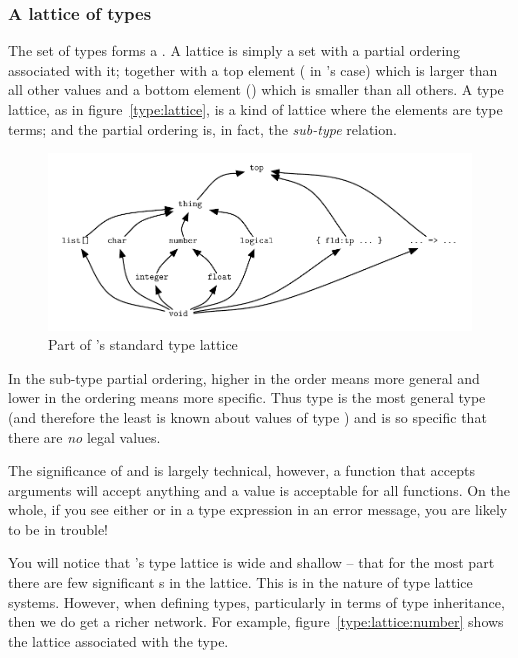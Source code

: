 \subsubsection{A lattice of types}
The set of types forms a . A lattice is simply a set with a partial ordering associated with it; together with a top element ( in \go's case) which is larger than all other values and a bottom element () which is smaller than all others. A type lattice, as in figure~\vref{type:lattice}, is a kind of lattice where the elements are type terms; and the partial ordering is, in fact, the \emph{sub-type} relation. 

\begin{figure}
\centerline{\includegraphics[width=\textwidth]{lattice}}
\caption{\label{type:lattice}Part of \go's standard type lattice}
\end{figure}

In the sub-type partial ordering, higher in the order means more general and lower in the ordering means more specific. Thus  type is the most general type (and therefore the least is known about values of type ) and  is so specific that there are \emph{no} legal  values.

The significance of  and  is largely technical, however, a function that accepts  arguments will accept anything and a  value is acceptable for all functions. On the whole, if you see either  or  in a type expression in an error message, you are likely to be in trouble!

You will notice that \go's type lattice is wide and shallow -- that for the most part there are few significant s in the lattice. This is in the nature of type lattice systems. However, when defining types, particularly in terms of type inheritance, then we do get a richer network. For example, figure~\vref{type:lattice:number} shows the lattice associated with the  type.


